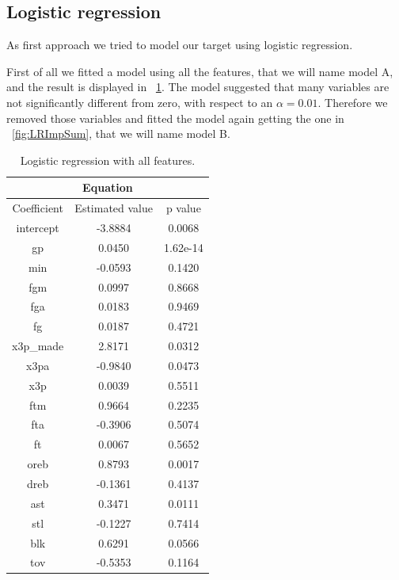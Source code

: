 \subsection{Logistic regression}

As first approach we tried to model our target using logistic regression.

First of all we fitted a model using all the features, that we will name model A, and the result is displayed in \Fig~\ref{table:LRAllSum}. The model suggested that many variables are not significantly different from zero, with respect to an $\alpha = 0.01$. Therefore we removed those variables and fitted the model again getting the one in \Fig~\ref{fig:LRImpSum}, that we will name model B.

\begin{table}[h]
	\begin{subtable}[h]{0.4\textwidth}
		\centering
		\begin{tabular}{||c | c | c ||} 
			\hline
			\multicolumn{3}{|c|}{Equation} \\
			\hline
			Coefficient & Estimated value & p value \\
			\hline
			intercept & -3.8884 & 0.0068 \\
			gp & 0.0450 & 1.62e-14 \\
			min & -0.0593 & 0.1420 \\
			fgm & 0.0997 & 0.8668 \\
			fga & 0.0183 & 0.9469 \\
			fg & 0.0187 & 0.4721 \\
			x3p\_made & 2.8171 & 0.0312 \\
			x3pa & -0.9840 & 0.0473 \\
			x3p & 0.0039 & 0.5511 \\
			ftm & 0.9664 & 0.2235 \\
			fta & -0.3906 & 0.5074 \\
			ft & 0.0067 & 0.5652 \\
			oreb & 0.8793 & 0.0017 \\
			dreb & -0.1361 & 0.4137 \\
			ast & 0.3471 & 0.0111 \\
			stl & -0.1227 & 0.7414 \\
			blk & 0.6291 & 0.0566 \\				
			tov & -0.5353 & 0.1164 \\		
			\hline
		\end{tabular}
		\caption{Logistic regression with all features.}
		\label{table:LRAllSum}
	\end{subtable}

\end{table}
